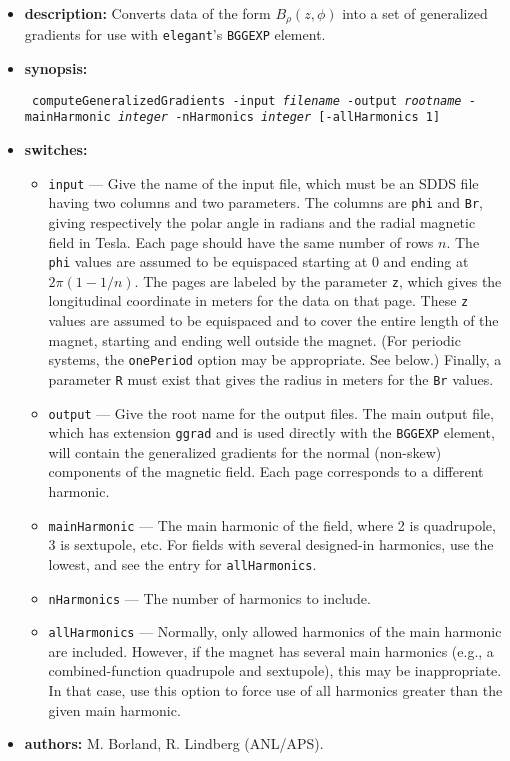\documentclass[11pt]{article}
\begin{document}
\begin{itemize}
\item {\bf description:}  Converts data of the form $B_\rho(z, \phi)$ into a set of generalized gradients \cite{Venturini-NIMA427-387} 
for use with {\tt elegant}'s \verb|BGGEXP| element.

\item {\bf synopsis:}
\begin{flushleft}{\tt
computeGeneralizedGradients -input {\em filename} -output {\em rootname} -mainHarmonic {\em integer} -nHarmonics {\em integer} 
[-allHarmonics 1] 
}\end{flushleft}

\item {\bf switches:}
\begin{itemize}
\item \verb|input| --- Give the name of the input file, which must be an SDDS file having two columns and two parameters.
The columns are \verb|phi| and \verb|Br|, giving respectively the polar angle in radians and the radial magnetic field in
Tesla. Each page should have the same number of rows $n$.
The \verb|phi| values are assumed to be equispaced starting at 0 and ending at $2\pi (1-1/n)$.
The pages are labeled by the parameter \verb|z|, which gives the longitudinal coordinate in meters for the data on that page.
These \verb|z| values are assumed to be equispaced and to cover the entire length of the magnet, starting and ending well outside
the magnet. (For periodic systems, the \verb|onePeriod| option may be appropriate. See below.)
Finally, a parameter \verb|R| must exist that gives the radius in meters for the \verb|Br| values.

\item \verb|output| --- Give the root name for the output files. The main output file, which has extension \verb|ggrad|
 and is used directly with the \verb|BGGEXP| element, will contain the generalized gradients for the normal (non-skew)
 components of the magnetic field. Each page corresponds to a different harmonic.

\item \verb|mainHarmonic| --- The main harmonic of the field, where 2 is quadrupole, 3 is sextupole, etc. For fields with
  several designed-in harmonics, use the lowest, and see the entry for \verb|allHarmonics|.

\item \verb|nHarmonics| --- The number of harmonics to include.

\item \verb|allHarmonics| --- Normally, only allowed harmonics of the main harmonic are included. However, if the magnet
  has several main harmonics (e.g., a combined-function quadrupole and sextupole), this may be inappropriate. In that
  case, use this option to force use of all harmonics greater than the given main harmonic.

\end{itemize}

\item {\bf authors:} M. Borland, R. Lindberg (ANL/APS).
\end{itemize}
\end{document}

